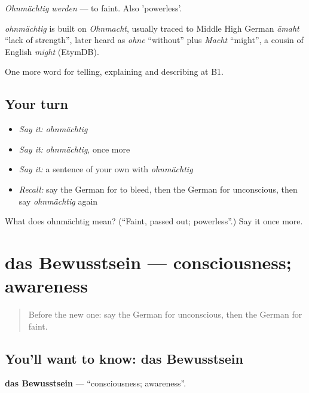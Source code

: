 \emph{Ohnmächtig werden} — to faint. Also 'powerless'.

\begin{cousinweb}
\emph{ohnmächtig} is built on \emph{Ohnmacht}, usually traced to Middle High German \emph{āmaht} \textquotedblleft{}lack of strength\textquotedblright{}, later heard as \emph{ohne} \textquotedblleft{}without\textquotedblright{} plus \emph{Macht} \textquotedblleft{}might\textquotedblright{}, a cousin of English \emph{might} (EtymDB).
\end{cousinweb}

\begin{grammarlens}[title={What you've built}]
One more word for telling, explaining and describing at B1.
\end{grammarlens}

\subsection*{Your turn}
\begin{itemize}
\raggedright
  \item \emph{Say it:} \emph{ohnmächtig}
  \item \emph{Say it:} \emph{ohnmächtig}, once more
  \item \emph{Say it:} a sentence of your own with \emph{ohnmächtig}
  \item \emph{Recall:} say the German for to bleed, then the German for unconscious, then say \emph{ohnmächtig} again
\end{itemize}

\begin{tcolorbox}[breakable,colback=teal!4,colframe=teal!35!black,title={Before you move on}]
What does ohnmächtig mean? (\textquotedblleft{}Faint, passed out; powerless\textquotedblright{}.) Say it once more.
\end{tcolorbox}
\section[das Bewusstsein]{das Bewusstsein — consciousness; awareness}

\label{lesson:GE-C290-bewusstsein}



\begin{quote}
Before the new one: say the German for unconscious, then the German for faint.
\end{quote}

\subsection*{You'll want to know: das Bewusstsein}
\textbf{das Bewusstsein} — \textquotedblleft{}consciousness; awareness\textquotedblright{}.

